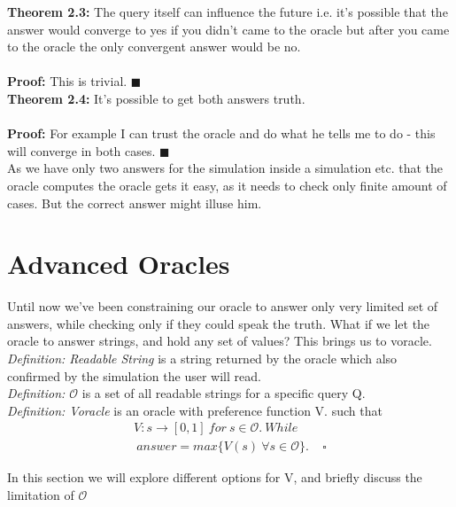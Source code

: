 \documentclass{article}
\begin{document}
\textbf{Theorem 2.3:} The query itself can influence the future i.e. it's possible that the answer would converge to yes if you didn't came to the oracle but after you came to the oracle the only convergent answer would be no. \\ \\
\textbf{Proof:} This is trivial. $\blacksquare$\\


\textbf{Theorem 2.4:} It's possible to get both answers truth. 
\\ \\
\textbf{Proof:} For example I can trust the oracle and do what he tells me to do - this will converge in both cases. $\blacksquare$\\

As we have only two answers for the simulation inside a simulation etc. that the oracle computes the oracle gets it easy, as it needs to check only finite amount of cases. But the correct answer might illuse him. 


\section{Advanced Oracles}

Until now we've been constraining our oracle to answer only very limited set of answers, while checking only if they could speak the truth. What if we let the oracle to answer strings, and hold any set of values? This brings us to voracle. \\ 

\textit{Definition: Readable String} is a string returned by the oracle which also confirmed by the simulation the user will read. \\

\textit{Definition: $\mathcal{O}$} is a set of all readable strings for a specific query Q. \\

\textit{Definition: Voracle} is an oracle with preference function V. such that 
\begin{align*}V: s \to [0,1] \ for \ s \in \mathcal{O}. \ While \\
\ answer = max\{V(s) \ \forall s \in \mathcal{O}\}.\ \ \ \ \  \square
\end{align*} 

In this section we will explore different options for V, and briefly discuss the limitation of $\mathcal{O}$ \\
\end{document}
